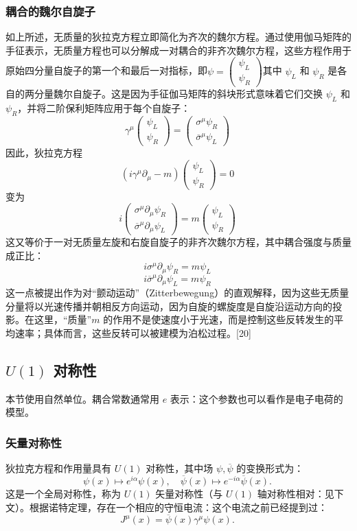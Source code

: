 \subsubsection{耦合的魏尔自旋子}
如上所述，无质量的狄拉克方程立即简化为齐次的魏尔方程。通过使用伽马矩阵的手征表示，无质量方程也可以分解成一对耦合的非齐次魏尔方程，这些方程作用于原始四分量自旋子的第一个和最后一对指标，即\(\psi = \begin{pmatrix} \psi_L \\ \psi_R \end{pmatrix}\)其中 \(\psi_L\) 和 \(\psi_R\) 是各自的两分量魏尔自旋子。这是因为手征伽马矩阵的斜块形式意味着它们交换 \(\psi_L\) 和 \(\psi_R\)，并将二阶保利矩阵应用于每个自旋子：
\[
\gamma^\mu \begin{pmatrix} \psi_L \\ \psi_R \end{pmatrix} = \begin{pmatrix} \sigma^\mu \psi_R \\ \overline{\sigma}^\mu \psi_L \end{pmatrix}~
\]
因此，狄拉克方程
\[
(i \gamma^\mu \partial_\mu - m) \begin{pmatrix} \psi_L \\ \psi_R \end{pmatrix} = 0~
\]
变为
\[
i \begin{pmatrix} \sigma^\mu \partial_\mu \psi_R \\ \overline{\sigma}^\mu \partial_\mu \psi_L \end{pmatrix} = m \begin{pmatrix} \psi_L \\ \psi_R \end{pmatrix}~
\]
这又等价于一对无质量左旋和右旋自旋子的非齐次魏尔方程，其中耦合强度与质量成正比：
\[
i \sigma^\mu \partial_\mu \psi_R = m \psi_L~
\]
\[
i \overline{\sigma}^\mu \partial_\mu \psi_L = m \psi_R~
\]
这一点被提出作为对“颤动运动”（Zitterbewegung）的直观解释，因为这些无质量分量将以光速传播并朝相反方向运动，因为自旋的螺旋度是自旋沿运动方向的投影。在这里，“质量”\(m\) 的作用不是使速度小于光速，而是控制这些反转发生的平均速率；具体而言，这些反转可以被建模为泊松过程。[20]
\subsection{\( U(1) \) 对称性 } 
本节使用自然单位。耦合常数通常用 \( e \) 表示：这个参数也可以看作是电子电荷的模型。
\subsubsection{矢量对称性} 
狄拉克方程和作用量具有 \( U(1) \) 对称性，其中场 \( \psi, \overline{\psi} \) 的变换形式为：  
\[
\psi(x) \mapsto e^{i\alpha} \psi(x), \quad \overline{\psi}(x) \mapsto e^{-i\alpha} \overline{\psi}(x).~
\]
这是一个全局对称性，称为 \( U(1) \) 矢量对称性（与 \( U(1) \) 轴对称性相对：见下文）。根据诺特定理，存在一个相应的守恒电流：这个电流之前已经提到过：
\[
J^{\mu}(x) = \overline{\psi}(x) \gamma^{\mu} \psi(x).~
\]
